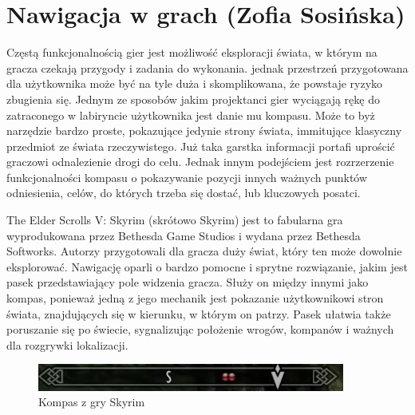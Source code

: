 \section{Nawigacja w grach (Zofia Sosińska)}\label{chap:skrm}
Częstą funkcjonalnością gier jest możliwość eksploracji świata, w którym na gracza czekają przygody i zadania do wykonania.
jednak przestrzeń przygotowana dla użytkownika może być na tyle duża i skomplikowana, że powstaje ryzyko 
zbugienia się. Jednym ze sposobów jakim projektanci gier wyciągają rękę do zatraconego w labiryncie użytkownika jest danie mu
kompasu. Może to byż narzędzie bardzo proste, pokazujące jedynie strony świata, immitujące klasyczny przedmiot ze świata rzeczywistego.
Już taka garstka informacji portafi uprościć graczowi odnalezienie drogi do celu. Jednak innym podejściem jest rozrzerzenie 
funkcjonalności kompasu o pokazywanie pozycji innych ważnych punktów odniesienia, celów, do których trzeba się dostać, lub 
kluczowych posatci.

The Elder Scrolls V: Skyrim (skrótowo Skyrim) jest to fabularna gra
wyprodukowana przez Bethesda Game Studios i wydana przez Bethesda Softworks. Autorzy przygotowali dla gracza duży świat,
który ten może dowolnie eksplorować. Nawigację oparli o bardzo pomocne i sprytne rozwiązanie,
jakim jest pasek przedstawiający pole widzenia gracza. Służy on między innymi jako kompas, ponieważ 
jedną z jego mechanik jest pokazanie użytkownikowi stron świata, znajdujących się w kierunku, w którym 
on patrzy. Pasek ułatwia także poruszanie się po świecie, sygnalizując położenie wrogów, kompanów i ważnych 
dla rozgrywki lokalizacji.

\begin{figure}[htbp]
	\centering
	\includegraphics[width=0.9\textwidth]{images/ui/compassSkyrim.png}
	\caption{Kompas z gry Skyrim}\label{fig:Fallout}
\end{figure}

